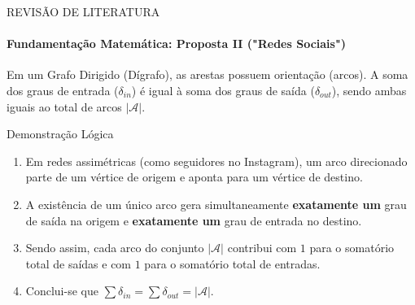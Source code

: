 \documentclass[10pt, aspectratio=169]{beamer}
\begin{document}
\begin{frame}{REVISÃO DE LITERATURA}
  \framesubtitle{Fundamentação Matemática: Proposta II ("Redes Sociais")}
  \begin{tcolorbox}[colback=white, colframe=uescgreen, title=Dígrafos e Conservação de Grau]
    Em um Grafo Dirigido (Dígrafo), as arestas possuem orientação (arcos). A soma dos graus de entrada ($\delta_{in}$) é igual à soma dos graus de saída ($\delta_{out}$), sendo ambas iguais ao total de arcos $|\mathcal{A}|$.
  \end{tcolorbox}
  
  \vspace{0.1cm}
  
  \begin{block}{Demonstração Lógica}
    \begin{enumerate}
        \item Em redes assimétricas (como seguidores no Instagram), um arco direcionado parte de um vértice de origem e aponta para um vértice de destino.
        \item A existência de um único arco gera simultaneamente \textbf{exatamente um} grau de saída na origem e \textbf{exatamente um} grau de entrada no destino.
        \item Sendo assim, cada arco do conjunto $|\mathcal{A}|$ contribui com $1$ para o somatório total de saídas e com $1$ para o somatório total de entradas.
        \item Conclui-se que $\sum \delta_{in} = \sum \delta_{out} = |\mathcal{A}|$. \qedsymbol
    \end{enumerate}
  \end{block}
\end{frame}
\end{document}
